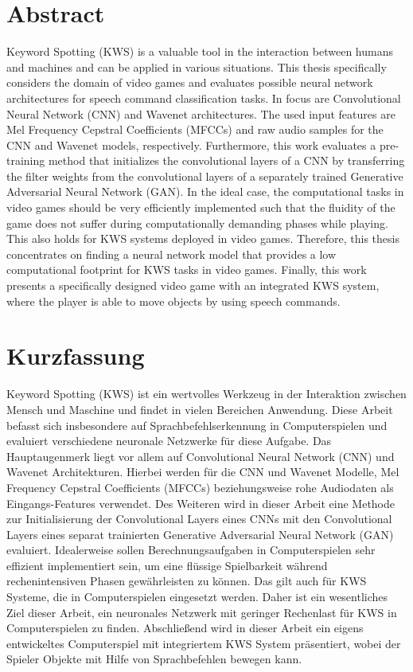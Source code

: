 
\chapter*{Abstract}\label{sec:shards_abstract}
Keyword Spotting (KWS) is a valuable tool in the interaction between humans and machines and can be applied in various situations.
This thesis specifically considers the domain of video games and evaluates possible neural network architectures for speech command classification tasks.
In focus are Convolutional Neural Network (CNN) and Wavenet architectures.
The used input features are Mel Frequency Cepstral Coefficients (MFCCs) and raw audio samples for the CNN and Wavenet models, respectively.
Furthermore, this work evaluates a pre-training method that initializes the convolutional layers of a CNN by transferring the filter weights from the convolutional layers of a separately trained Generative Adversarial Neural Network (GAN).
In the ideal case, the computational tasks in video games should be very efficiently implemented such that the fluidity of the game does not suffer during computationally demanding phases while playing.
This also holds for KWS systems deployed in video games.
Therefore, this thesis concentrates on finding a neural network model that provides a low computational footprint for KWS tasks in video games.
Finally, this work presents a specifically designed video game with an integrated KWS system, where the player is able to move objects by using speech commands.



\chapter*{Kurzfassung}
Keyword Spotting (KWS) ist ein wertvolles Werkzeug in der Interaktion zwischen Mensch und Maschine und findet in vielen Bereichen Anwendung.
Diese Arbeit befasst sich insbesondere auf Sprachbefehlserkennung in Computerspielen und evaluiert verschiedene neuronale Netzwerke für diese Aufgabe.
Das Hauptaugenmerk liegt vor allem auf Convolutional Neural Network (CNN) und Wavenet Architekturen.
Hierbei werden für die CNN und Wavenet Modelle, Mel Frequency Cepstral Coefficients (MFCCs) beziehungsweise rohe Audiodaten als Eingangs-Features verwendet.
Des Weiteren wird in dieser Arbeit eine Methode zur Initialisierung der Convolutional Layers eines CNNs mit den Convolutional Layers eines separat trainierten Generative Adversarial Neural Network (GAN) evaluiert.
Idealerweise sollen Berechnungsaufgaben in Computerspielen sehr effizient implementiert sein, um eine flüssige Spielbarkeit während rechenintensiven Phasen gewährleisten zu können.
Das gilt auch für KWS Systeme, die in Computerspielen eingesetzt werden.
Daher ist ein wesentliches Ziel dieser Arbeit, ein neuronales Netzwerk mit geringer Rechenlast für KWS in Computerspielen zu finden.
Abschließend wird in dieser Arbeit ein eigens entwickeltes Computerspiel mit integriertem KWS System präsentiert, wobei der Spieler Objekte mit Hilfe von Sprachbefehlen bewegen kann.